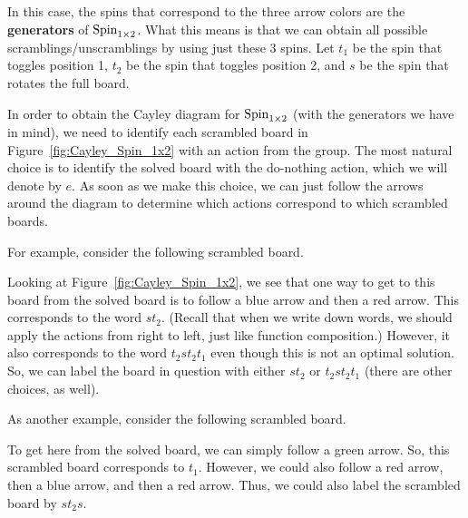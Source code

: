\noindent In this case, the spins that correspond to the three arrow colors are the \textbf{generators} of $\operatorname{Spin}_{1\times 2}$.  What this means is that we can obtain all possible scramblings/unscramblings by using just these 3 spins.  Let $t_1$ be the spin that toggles position 1, $t_2$ be the spin that toggles position 2, and $s$ be the spin that rotates the full board.  

In order to obtain the Cayley diagram for $\operatorname{Spin}_{1\times 2}$ (with the generators we have in mind), we need to identify each scrambled board in Figure~\ref{fig:Cayley_Spin_1x2} with an action from the group.  The most natural choice is to identify the solved board with the do-nothing action, which we will denote by $e$.  As soon as we make this choice, we can just follow the arrows around the diagram to determine which actions correspond to which scrambled boards.  

For example, consider the following scrambled board.
\begin{center}
\end{center}
Looking at Figure~\ref{fig:Cayley_Spin_1x2}, we see that one way to get to this board from the solved board is to follow a blue arrow and then a red arrow.  This corresponds to the word $st_2$.  (Recall that when we write down words, we should apply the actions from right to left, just like function composition.) However, it also corresponds to the word $t_2st_2t_1$ even though this is not an optimal solution.  So, we can label the board in question with either $st_2$ or $t_2st_2t_1$ (there are other choices, as well).

As another example, consider the following scrambled board.
\begin{center}
\end{center}
To get here from the solved board, we can simply follow a green arrow. So, this scrambled board corresponds to $t_1$.  However, we could also follow a red arrow, then a blue arrow, and then a red arrow. Thus, we could also label the scrambled board by $s t_2 s$.

